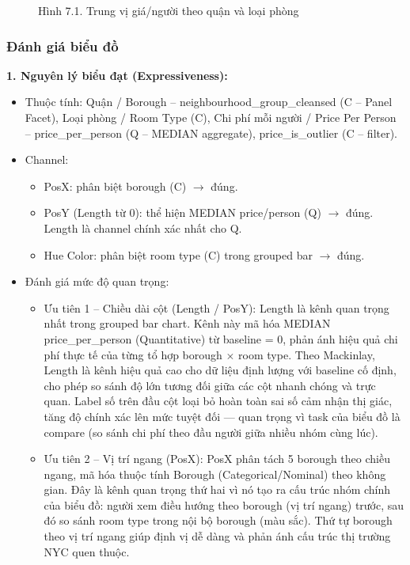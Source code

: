 \begin{figure}[H]
    \centering
    \caption{Hình 7.1. Trung vị giá/người theo quận và loại phòng}
    \label{fig:domain-task7-chart1}
\end{figure}

\subsubsection{Đánh giá biểu đồ}

\textbf{1. Nguyên lý biểu đạt (Expressiveness):}

\begin{itemize}
    \item Thuộc tính: Quận / Borough -- neighbourhood\_group\_cleansed (C -- Panel Facet), Loại phòng / Room Type (C), Chi phí mỗi người / Price Per Person -- price\_per\_person (Q -- MEDIAN aggregate), price\_is\_outlier (C -- filter).
    \item Channel:
    \begin{itemize}
        \item PosX: phân biệt borough (C) $\rightarrow$ đúng.
        \item PosY (Length từ 0): thể hiện MEDIAN price/person (Q) $\rightarrow$ đúng. Length là channel chính xác nhất cho Q.
        \item Hue Color: phân biệt room type (C) trong grouped bar $\rightarrow$ đúng.
    \end{itemize}
    \item Đánh giá mức độ quan trọng:
    \begin{itemize}
        \item Ưu tiên 1 -- Chiều dài cột (Length / PosY): Length là kênh quan trọng nhất trong grouped bar chart. Kênh này mã hóa MEDIAN price\_per\_person (Quantitative) từ baseline = 0, phản ánh hiệu quả chi phí thực tế của từng tổ hợp borough $\times$ room type. Theo Mackinlay, Length là kênh hiệu quả cao cho dữ liệu định lượng với baseline cố định, cho phép so sánh độ lớn tương đối giữa các cột nhanh chóng và trực quan. Label số trên đầu cột loại bỏ hoàn toàn sai số cảm nhận thị giác, tăng độ chính xác lên mức tuyệt đối --- quan trọng vì task của biểu đồ là compare (so sánh chi phí theo đầu người giữa nhiều nhóm cùng lúc).
        \item Ưu tiên 2 -- Vị trí ngang (PosX): PosX phân tách 5 borough theo chiều ngang, mã hóa thuộc tính Borough (Categorical/Nominal) theo không gian. Đây là kênh quan trọng thứ hai vì nó tạo ra cấu trúc nhóm chính của biểu đồ: người xem điều hướng theo borough (vị trí ngang) trước, sau đó so sánh room type trong nội bộ borough (màu sắc). Thứ tự borough theo vị trí ngang giúp định vị dễ dàng và phản ánh cấu trúc thị trường NYC quen thuộc.

\end{itemize}
\end{itemize}
